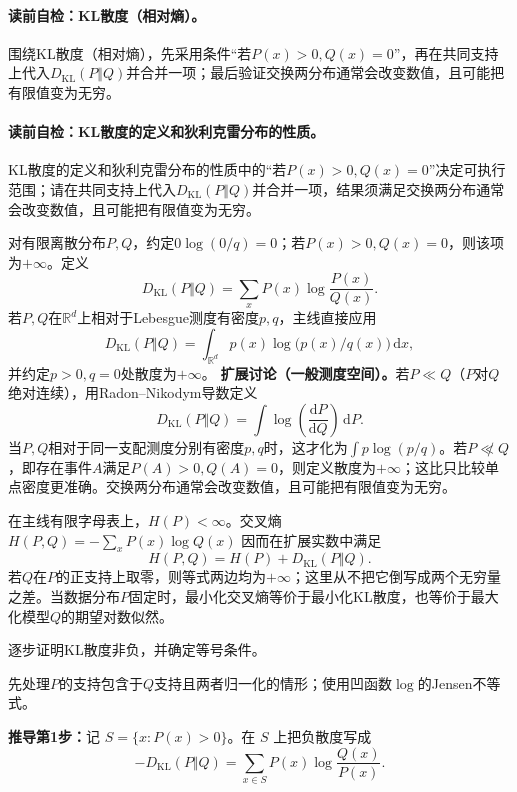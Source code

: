 \paragraph{读前自检：KL散度（相对熵）。}围绕KL散度（相对熵），先采用条件“若$P(x)>0,Q(x)=0$”，再在共同支持上代入$D_{\mathrm{KL}}(P\Vert Q)$并合并一项；最后验证交换两分布通常会改变数值，且可能把有限值变为无穷。\par
\paragraph{读前自检：KL散度的定义和狄利克雷分布的性质。}KL散度的定义和狄利克雷分布的性质中的“若$P(x)>0,Q(x)=0$”决定可执行范围；请在共同支持上代入$D_{\mathrm{KL}}(P\Vert Q)$并合并一项，结果须满足交换两分布通常会改变数值，且可能把有限值变为无穷。\par

对有限离散分布$P,Q$，约定$0\log(0/q)=0$；若$P(x)>0,Q(x)=0$，则该项为$+\infty$。定义
\begin{equation}\label{eq:V1-C06-kl-definition}
D_{\mathrm{KL}}(P\Vert Q)=\sum_xP(x)\log\frac{P(x)}{Q(x)}.
\end{equation}
若$P,Q$在$\mathbb R^d$上相对于Lebesgue测度有密度$p,q$，主线直接应用
\[
D_{\mathrm{KL}}(P\Vert Q)
=\int_{\mathbb R^d}p(x)\log\!\bigl(p(x)/q(x)\bigr)\,\mathrm dx,
\]
并约定$p>0,q=0$处散度为$+\infty$。
\textbf{扩展讨论（一般测度空间）。}若$P\ll Q$（$P$对$Q$绝对连续），用Radon--Nikodym导数定义
\[
D_{\mathrm{KL}}(P\Vert Q)=\int\log\!\left(\frac{\mathrm dP}{\mathrm dQ}\right)\,\mathrm dP.
\]
当$P,Q$相对于同一支配测度分别有密度$p,q$时，这才化为$\int p\log(p/q)$。若$P\not\ll Q$，即存在事件$A$满足$P(A)>0,Q(A)=0$，则定义散度为$+\infty$；这比只比较单点密度更准确。交换两分布通常会改变数值，且可能把有限值变为无穷。

在主线有限字母表上，$H(P)<\infty$。交叉熵 $H(P,Q)=-\sum_xP(x)\log Q(x)$ 因而在扩展实数中满足
\[
H(P,Q)=H(P)+D_{\mathrm{KL}}(P\Vert Q).
\]
若$Q$在$P$的正支持上取零，则等式两边均为$+\infty$；这里从不把它倒写成两个无穷量之差。当数据分布$P$固定时，最小化交叉熵等价于最小化KL散度，也等价于最大化模型$Q$的期望对数似然。

\label{struct:V1-C06-CH11}
\begin{derivationgoalbox}
逐步证明KL散度非负，并确定等号条件。
\end{derivationgoalbox}
\begin{derivationprepbox}
先处理$P$的支持包含于$Q$支持且两者归一化的情形；使用凹函数$\log$的Jensen不等式。
\end{derivationprepbox}
\textbf{推导第1步：}记 $S=\{x:P(x)>0\}$。在 $S$ 上把负散度写成
\[
-D_{\mathrm{KL}}(P\Vert Q)=\sum_{x\in S}P(x)\log\frac{Q(x)}{P(x)}.
\]

